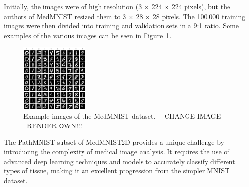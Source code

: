 Initially, the images were of high resolution (3 $\times$ 224 $\times$ 224 pixels), but the authors of MedMNIST resized them to 3 $\times$ 28 $\times$ 28 pixels. The 100.000 training images were then divided into training and validation sets in a 9:1 ratio. Some examples of the various images can be seen in Figure~\ref{fig:MedMNIST}.

\begin{figure}
    \centering
    \includegraphics[width=0.3\textwidth]{figures/MNIST.png}
    \caption{Example images of the MedMNIST dataset.~-~CHANGE IMAGE~-~RENDER OWN!!!}\label{fig:MedMNIST}
\end{figure}


The PathMNIST subset of MedMNIST2D provides a unique challenge by introducing the complexity of medical image analysis. It requires the use of advanced deep learning techniques and models to accurately classify different types of tissue, making it an excellent progression from the simpler MNIST dataset.
